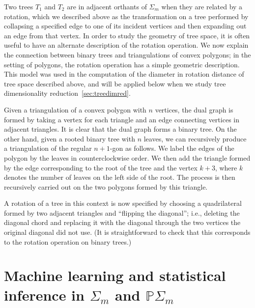 \documentclass[a4paper,11pt]{article}
\begin{document}
Two trees $T_1$ and $T_2$ are in adjacent orthants of $\Sigma_m$ when they are related by a rotation, which we described above as the transformation on a tree performed by collapsing a specified edge to one of its incident vertices and then expanding out an edge from that vertex.
In order to study the geometry of tree space, it is often useful to have an alternate description of the rotation operation.
We now explain the connection between binary trees and triangulations of convex polygons; in the setting of polygons, the rotation operation has a simple geometric description.
This model was used in the computation of the diameter in rotation distance of tree space described above, and will be applied below when we study tree dimensionality reduction~\ref{sec:treedimred}.

Given a triangulation of a convex polygon with $n$ vertices, the dual graph is formed by taking a vertex for each triangle and an edge connecting vertices in adjacent triangles.
It is clear that the dual graph forms a binary tree.
On the other hand, given a rooted binary tree with $n$ leaves, we can recursively produce a triangulation of the regular $n+1$-gon as follows.
We label the edges of the polygon by the leaves in counterclockwise order.
We then add the triangle formed by the edge corresponding to the root of the tree and the vertex $k+3$, where $k$ denotes the number of leaves on the left side of the root.
The process is then recursively carried out on the two polygons formed by this triangle.

A rotation of a tree in this context is now specified by choosing a quadrilateral formed by two adjacent triangles and ``flipping the diagonal''; i.e., deleting the diagonal chord and replacing it with the diagonal through the two vertices the original diagonal did not use.
(It is straightforward to check that this corresponds to the rotation operation on binary trees.)


\section{Machine learning and statistical inference in $\Sigma_m$ and $\mathbb{P}\Sigma_m$}\label{sec:ML}
\end{document}
